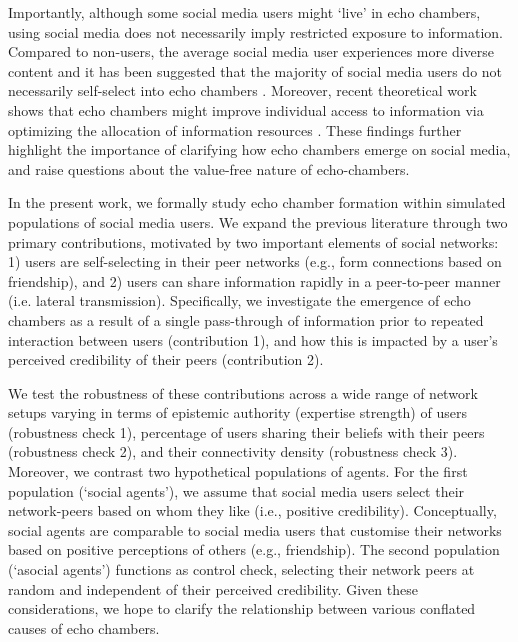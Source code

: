 \documentclass[fleqn,10pt]{wlscirep}
\begin{document}
Importantly, although some social media users might `live' in echo chambers, using social media does not necessarily imply restricted exposure to information. Compared to non-users, the average social media user experiences more diverse content \cite{newman2017reuters} and it has been suggested that the majority of social media users do not necessarily self-select into echo chambers \cite{haw2020drives}. Moreover, recent theoretical work shows that echo chambers might improve individual access to information via optimizing the allocation of information resources \cite{jann2018echo}. These findings further highlight the importance of clarifying how echo chambers emerge on social media, and raise questions about the value-free nature of echo-chambers. %

In the present work, we formally study echo chamber formation within simulated populations of social media users. We expand the previous literature through two primary contributions, motivated by two important elements of social networks: 1) users are self-selecting in their peer networks (e.g., form connections based on friendship), and 2) users can share information rapidly in a peer-to-peer manner (i.e. lateral transmission). Specifically, we investigate the emergence of echo chambers as a result of a single pass-through of information prior to repeated interaction between users (contribution 1), and how this is impacted by a user's perceived credibility of their peers (contribution 2). 

We test the robustness of these contributions across a wide range of network setups varying in terms of epistemic authority (expertise strength) of users (robustness check 1), percentage of users sharing their beliefs with their peers (robustness check 2), and their connectivity density (robustness check 3). Moreover, we contrast two hypothetical populations of agents. For the first population (`social agents'), we assume that social media users select their network-peers based on whom they like (i.e., positive credibility). Conceptually, social agents are comparable to social media users that customise their networks based on positive perceptions of others (e.g., friendship). The second population (`asocial agents') functions as control check, selecting their network peers at random and independent of their perceived credibility. Given these considerations, we hope to clarify the relationship between various conflated causes of echo chambers. 
\end{document}
